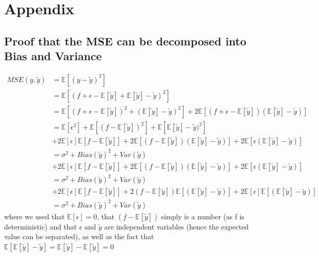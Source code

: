 \documentclass[11pt,a4paper,titlepage]{article}
\begin{document}
\section{Appendix}
\subsection{Proof that the MSE can be decomposed into Bias and Variance}
\begin{equation}\label{Proof}
\begin{split}
MSE(y,\tilde y) & =\mathbb{E}\left[({y}-{\tilde y})^2  \right] \\
&= \mathbb{E}\left[({f}+{\epsilon}-\mathbb{E}\left[\tilde y\right]+\mathbb{E}\left[\tilde y\right]-{\tilde y})^2  \right]\\
&= \mathbb{E}\left[(f+\epsilon- \mathbb{E}\left[\tilde y\right])^2+(\mathbb{E}\left[\tilde y\right]-{\tilde y})^2 \right]+2\mathbb{E}\left[(f+\epsilon-\mathbb{E}\left[\tilde y\right])(\mathbb{E}\left[\tilde y\right]-\tilde y)\right]\\
&= \mathbb{E}\left[\epsilon^2\right]+\mathbb{E}\left[(f-\mathbb{E}\left[\tilde y\right])^2\right]+\mathbb{E}\left[ \mathbb{E}\left[\tilde y\right]-\tilde y)^2\right]\\   & +2\mathbb{E}\left[\epsilon\right]\mathbb{E}\left[f-\mathbb{E}\left[\tilde y\right]\right]+2\mathbb{E}\left[(f-\mathbb{E}\left[\tilde y\right])(\mathbb{E}\left[\tilde y\right]-\tilde y)\right] +2\mathbb{E}\left[\epsilon (\mathbb{E}\left[\tilde y\right]-\tilde y)\right] \\ 
&=\sigma^2+Bias(\tilde y)^2+Var(\tilde y) \\ &
+2\mathbb{E}\left[\epsilon\right]\mathbb{E}\left[f-\mathbb{E}\left[\tilde y\right]\right]+2\mathbb{E}\left[(f-\mathbb{E}\left[\tilde y\right])(\mathbb{E}\left[\tilde y\right]-\tilde y)\right] +2\mathbb{E}\left[\epsilon (\mathbb{E}\left[\tilde y\right]-\tilde y)\right] \\
&=\sigma^2+Bias(\tilde y)^2+Var(\tilde y) \\ &
+2\mathbb{E}\left[\epsilon\right]\mathbb{E}\left[f-\mathbb{E}\left[\tilde y\right]\right]+2(f-\mathbb{E}\left[\tilde y\right])\mathbb{E}\left[(\mathbb{E}\left[\tilde y\right]-\tilde y)\right] +2\mathbb{E}\left[\epsilon\right]\mathbb{E}\left[ (\mathbb{E}\left[\tilde y\right]-\tilde y)\right]\\
&=\sigma^2+Bias(\tilde y)^2+Var(\tilde y)
\end{split}
\end{equation}
where we used that $\mathbb{E}\left[\epsilon\right]=0$, that $(f-\mathbb{E}\left[\tilde y\right])$ simply is a number (as f is deterministic) and that $\epsilon$ and $\tilde y$ are independent variables (hence the expected value can be separated), as well as the fact that $\mathbb{E}\left[\mathbb{E}\left[\tilde y\right]-\tilde y\right]=\mathbb{E}\left[\tilde y\right]-\mathbb{E}\left[\tilde y\right]=0$ 
\end{document}
